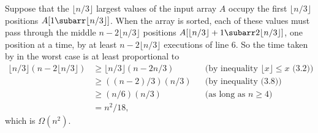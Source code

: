 Suppose that the $\lfloor n/3\rfloor$ largest values of the input array $A$ occupy the first $\lfloor n/3\rfloor$ positions $A[1\subarr\lfloor n/3\rfloor]$.
When the array is sorted, each of these values must pass through the middle $n-2\lfloor n/3\rfloor$ positions $A[\lfloor n/3\rfloor+1\subarr 2\lfloor n/3\rfloor]$, one position at a time, by at least $n-2\lfloor n/3\rfloor$ executions of line 6.
So the time taken by  in the worst case is at least proportional to
\begin{align*}
    \lfloor n/3\rfloor(n-2\lfloor n/3\rfloor) &\ge \lfloor n/3\rfloor(n-2n/3) && \text{(by inequality $\lfloor x\rfloor\le x$ (3.2))} \\
    &\ge ((n-2)/3)(n/3) && \text{(by inequality (3.8))} \\
    &\ge (n/6)(n/3) && \text{(as long as $n\ge4$)} \\
    &= n^2\!/18,
\end{align*}
which is $\Omega(n^2)$.
